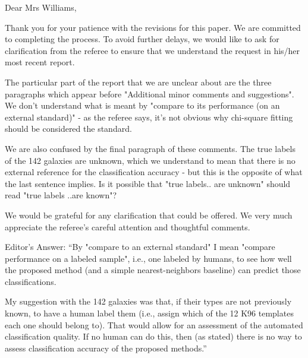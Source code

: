 Dear Mrs Williams,

Thank you for your patience with the revisions for this paper. We are committed to completing the process. To avoid further delays, we would like to ask for clarification from the referee to ensure that we understand the request in his/her most recent report.

The particular part of the report that we are unclear about are the three paragraphs which appear before "Additional minor comments and suggestions". We don't understand what is meant by "compare to its performance (on an external standard)" - as the referee says, it's not obvious why chi-square fitting should be considered the standard.

We are also confused by the final paragraph of these comments. The true labels of the 142 galaxies are unknown, which we understand to mean that there is no external reference for the classification accuracy - but this is the opposite of what the last sentence implies. Is it possible that "true labels.. are unknown" should read "true labels ..are known"?

We would be grateful for any clarification that could be offered. We very much appreciate the referee's careful attention and thoughtful comments.


Editor's Answer:
“By "compare to an external standard" I mean "compare performance on a labeled sample", i.e., one labeled by humans, to see how well the proposed method (and a simple nearest-neighbors baseline) can predict those classifications. 
 
My suggestion with the 142 galaxies was that, if their types are not previously known, to have a human label them (i.e., assign which of the 12 K96 templates each one should belong to).  That would allow for an assessment of the automated classification quality.  If no human can do this, then (as stated) there is no way to assess classification accuracy of the proposed methods.”